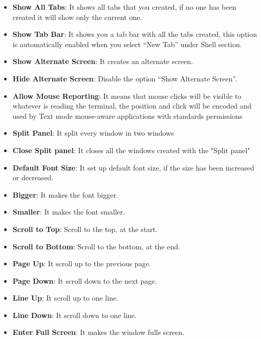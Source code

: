 \documentclass[hidelinks,12pt,a4paper,numbers=enddot]{scrartcl}
\begin{document}
 \begin{itemize}
    \item \textbf{Show All Tabs}:
        It shows all tabs that you created, if no one has been created it will
        show only the current one.
    
    \item \textbf{Show Tab Bar}:
        It shows you a tab bar with all the tabs created, this option is
        automatically enabled when you select “New Tab” under Shell section.
    
    \item \textbf{Show Alternate Screen}: It creates an alternate screen.
    \item \textbf{Hide Alternate Screen}: Disable the option “Show Alternate Screen”.
    \item \textbf{Allow Mouse Reporting}:
        It means that mouse clicks will be visible to whatever is reading the terminal,
        the position and click will be encoded and used by Text mode mouse-aware
        applications with standards permissions
    
    \item \textbf{Split Panel}: It split every window in two windows
    \item \textbf{Close Split panel}: It closes all the windows created with the "Split panel"
    \item \textbf{Default Font Size}:
        It set up default font size, if the size has been increased or decreased.
    
    \item \textbf{Bigger}: It makes the font bigger.
    \item \textbf{Smaller}: It makes the font smaller.
    \item \textbf{Scroll to Top}: Scroll to the top, at the start.
    \item \textbf{Scroll to Bottom}: Scroll to the bottom, at the end.
    \item \textbf{Page Up}: It scroll up to the previous page.
    \item \textbf{Page Down}: It scroll down to the next page.
    \item \textbf{Line Up}: It scroll up to one line.
    \item \textbf{Line Down}: It scroll down to one line.
    \item \textbf{Enter Full Screen}: It makes the window fulls screen.
\end{itemize}
\end{document}
